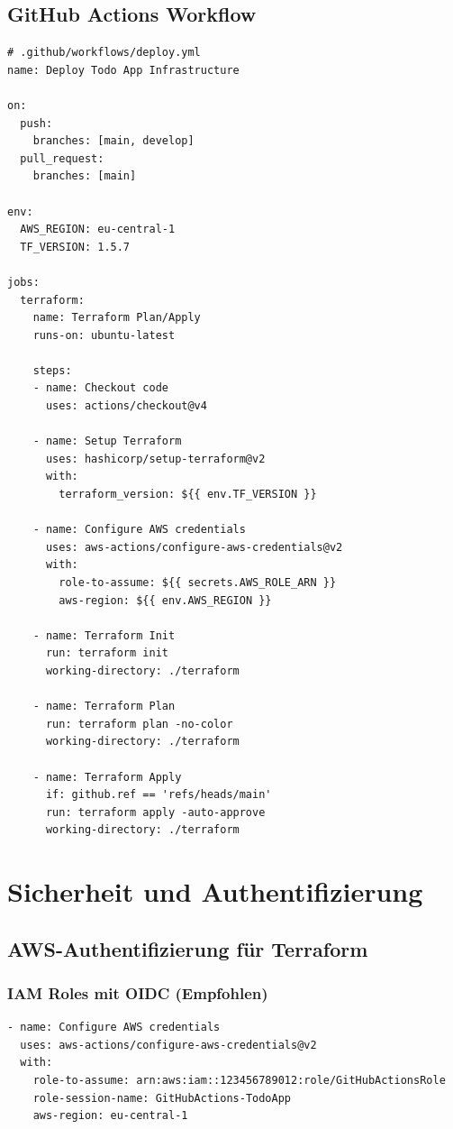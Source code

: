 \newpage
\subsection{GitHub Actions Workflow}

\begin{lstlisting}[style=yaml, caption=GitHub Actions Deployment Workflow]
# .github/workflows/deploy.yml
name: Deploy Todo App Infrastructure

on:
  push:
    branches: [main, develop]
  pull_request:
    branches: [main]

env:
  AWS_REGION: eu-central-1
  TF_VERSION: 1.5.7

jobs:
  terraform:
    name: Terraform Plan/Apply
    runs-on: ubuntu-latest
    
    steps:
    - name: Checkout code
      uses: actions/checkout@v4
      
    - name: Setup Terraform
      uses: hashicorp/setup-terraform@v2
      with:
        terraform_version: ${{ env.TF_VERSION }}
        
    - name: Configure AWS credentials
      uses: aws-actions/configure-aws-credentials@v2
      with:
        role-to-assume: ${{ secrets.AWS_ROLE_ARN }}
        aws-region: ${{ env.AWS_REGION }}
        
    - name: Terraform Init
      run: terraform init
      working-directory: ./terraform
      
    - name: Terraform Plan
      run: terraform plan -no-color
      working-directory: ./terraform
      
    - name: Terraform Apply
      if: github.ref == 'refs/heads/main'
      run: terraform apply -auto-approve
      working-directory: ./terraform
\end{lstlisting}
\section{Sicherheit und Authentifizierung}

\subsection{AWS-Authentifizierung für Terraform}

\subsubsection{IAM Roles mit OIDC (Empfohlen)}

\begin{lstlisting}[style=yaml, caption=AWS Credential Configuration]
- name: Configure AWS credentials
  uses: aws-actions/configure-aws-credentials@v2
  with:
    role-to-assume: arn:aws:iam::123456789012:role/GitHubActionsRole
    role-session-name: GitHubActions-TodoApp
    aws-region: eu-central-1
\end{lstlisting}

